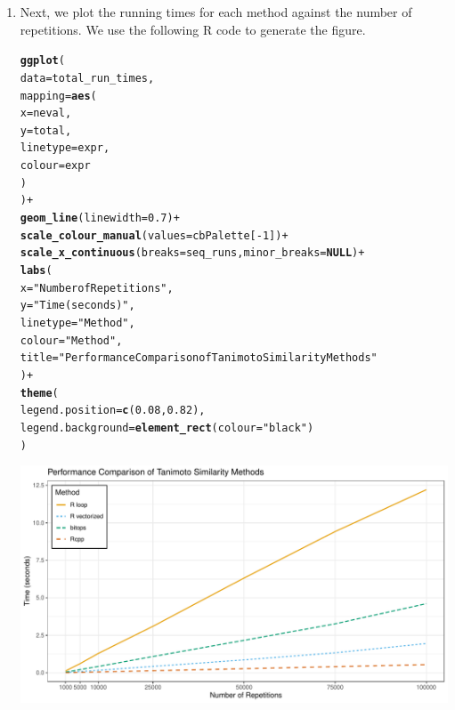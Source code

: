 \documentclass[a4paper,11pt]{article}\usepackage[]{graphicx}\usepackage[]{xcolor}
\makeatletter
\def\maxwidth{ %
  \ifdim\Gin@nat@width>\linewidth
    \linewidth
  \else
    \Gin@nat@width
  \fi
}
\newcommand{\hlnum}[1]{\textcolor[rgb]{0.686,0.059,0.569}{#1}}%
\newcommand{\hlsng}[1]{\textcolor[rgb]{0.192,0.494,0.8}{#1}}%
\newcommand{\hlopt}[1]{\textcolor[rgb]{0,0,0}{#1}}%
\newcommand{\hldef}[1]{\textcolor[rgb]{0.345,0.345,0.345}{#1}}%
\newcommand{\hlkwa}[1]{\textcolor[rgb]{0.161,0.373,0.58}{\textbf{#1}}}%
\newcommand{\hlkwc}[1]{\textcolor[rgb]{0.333,0.667,0.333}{#1}}%
\newcommand{\hlkwd}[1]{\textcolor[rgb]{0.737,0.353,0.396}{\textbf{#1}}}%
\newenvironment{kframe}{%
 \def\at@end@of@kframe{}%
 \ifinner\ifhmode%
  \def\at@end@of@kframe{\end{minipage}}%
  \begin{minipage}{\columnwidth}%
 \fi\fi%
 \def\FrameCommand##1{\hskip\@totalleftmargin \hskip-\fboxsep
 \colorbox{shadecolor}{##1}\hskip-\fboxsep
     \hskip-\linewidth \hskip-\@totalleftmargin \hskip\columnwidth}%
 \MakeFramed {\advance\hsize-\width
   \@totalleftmargin\z@ \linewidth\hsize
   \@setminipage}}%
 {\par\unskip\endMakeFramed%
 \at@end@of@kframe}
\newenvironment{knitrout}{}{} %
\makeatother
\begin{document}
\begin{enumerate}
\begin{enumerate}
\item Next, we plot the running times for each method against the number of repetitions. We use the following R code to generate the figure. 

\begin{knitrout}
\color{fgcolor}\begin{kframe}
\begin{alltt}
\hlkwd{ggplot}\hldef{(}
  \hlkwc{data} \hldef{= total_run_times,}
  \hlkwc{mapping} \hldef{=} \hlkwd{aes}\hldef{(}
    \hlkwc{x} \hldef{= neval,}
    \hlkwc{y} \hldef{= total,}
    \hlkwc{linetype} \hldef{= expr,}
    \hlkwc{colour} \hldef{= expr}
  \hldef{)}
\hldef{)} \hlopt{+}
  \hlkwd{geom_line}\hldef{(}\hlkwc{linewidth} \hldef{=} \hlnum{0.7}\hldef{)} \hlopt{+}
  \hlkwd{scale_colour_manual}\hldef{(}\hlkwc{values} \hldef{= cbPalette[}\hlopt{-}\hlnum{1}\hldef{])} \hlopt{+}
  \hlkwd{scale_x_continuous}\hldef{(}\hlkwc{breaks} \hldef{= seq_runs,} \hlkwc{minor_breaks} \hldef{=} \hlkwa{NULL}\hldef{)} \hlopt{+}
  \hlkwd{labs}\hldef{(}
    \hlkwc{x} \hldef{=} \hlsng{"Number of Repetitions"}\hldef{,}
    \hlkwc{y} \hldef{=} \hlsng{"Time (seconds)"}\hldef{,}
    \hlkwc{linetype} \hldef{=} \hlsng{"Method"}\hldef{,}
    \hlkwc{colour} \hldef{=} \hlsng{"Method"}\hldef{,}
    \hlkwc{title} \hldef{=} \hlsng{"Performance Comparison of Tanimoto Similarity Methods"}
  \hldef{)} \hlopt{+}
  \hlkwd{theme}\hldef{(}
    \hlkwc{legend.position} \hldef{=} \hlkwd{c}\hldef{(}\hlnum{0.08}\hldef{,} \hlnum{0.82}\hldef{),}
    \hlkwc{legend.background} \hldef{=} \hlkwd{element_rect}\hldef{(}\hlkwc{colour} \hldef{=} \hlsng{"black"}\hldef{)}
  \hldef{)}
\end{alltt}
\end{kframe}

{\centering \includegraphics[width=\maxwidth]{figure/plot_running_times-1} 

}
\end{knitrout}
\end{enumerate}
\end{enumerate}
\end{document}
